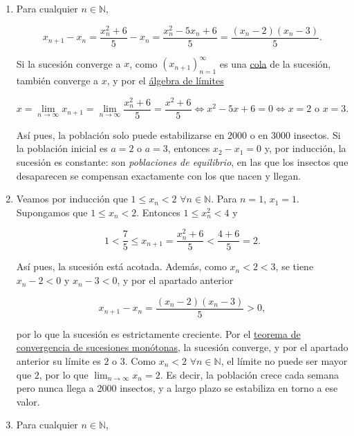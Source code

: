 \documentclass[
  spanish,
  a4paper,
]{scrreport}
\theoremstyle{definition}
\theoremstyle{remark}
\begin{document}
\begin{tcolorbox}[enhanced jigsaw, arc=.35mm, bottomrule=.15mm, bottomtitle=1mm, breakable, colback=white, colbacktitle=quarto-callout-tip-color!10!white, colframe=quarto-callout-tip-color-frame, coltitle=black, left=2mm, leftrule=.75mm, opacityback=0, opacitybacktitle=0.6, rightrule=.15mm, title=\textcolor{quarto-callout-tip-color}{\faLightbulb}\hspace{0.5em}{Solución}, titlerule=0mm, toprule=.15mm, toptitle=1mm]

\begin{enumerate}
\def\labelenumi{\alph{enumi}.}
\item
  Para cualquier \(n\in\mathbb{N}\),

  \[
  x_{n+1}-x_n = \frac{x_n^2+6}{5} - x_n = \frac{x_n^2 - 5x_n + 6}{5} = \frac{(x_n-2)(x_n-3)}{5}.
  \]

  Si la sucesión converge a \(x\), como \((x_{n+1})_{n=1}^\infty\) es
  una
  \href{https://aprendeconalf.es/analisis-manual/04-sucesiones.html\#prp-convergencia-cola-sucesion}{cola}
  de la sucesión, también converge a \(x\), y por el
  \href{https://aprendeconalf.es/analisis-manual/04-sucesiones.html\#prp-algebra-limites-sucesiones}{álgebra
  de límites}

  \[
  x = \lim_{n\to\infty}x_{n+1} = \lim_{n\to\infty}\frac{x_n^2+6}{5} = \frac{x^2+6}{5} \Leftrightarrow x^2-5x+6 = 0 \Leftrightarrow x=2 \text{ o } x=3.
  \]

  Así pues, la población solo puede estabilizarse en 2000 o en 3000
  insectos. Si la población inicial es \(a=2\) o \(a=3\), entonces
  \(x_2-x_1=0\) y, por inducción, la sucesión es constante: son
  \emph{poblaciones de equilibrio}, en las que los insectos que
  desaparecen se compensan exactamente con los que nacen y llegan.
\item
  Veamos por inducción que \(1\leq x_n < 2\) \(\forall n\in\mathbb{N}\).
  Para \(n=1\), \(x_1 = 1\). Supongamos que \(1\leq x_n<2\). Entonces
  \(1\leq x_n^2<4\) y

  \[
  1 < \frac{7}{5} \leq x_{n+1} = \frac{x_n^2+6}{5} < \frac{4+6}{5} = 2.
  \]

  Así pues, la sucesión está acotada. Además, como \(x_n<2<3\), se tiene
  \(x_n-2<0\) y \(x_n-3<0\), y por el apartado anterior

  \[
  x_{n+1}-x_n = \frac{(x_n-2)(x_n-3)}{5} > 0,
  \]

  por lo que la sucesión es estrictamente creciente. Por el
  \href{https://aprendeconalf.es/analisis-manual/04-sucesiones.html\#thm-convergencia-monotona}{teorema
  de convergencia de sucesiones monótonas}, la sucesión converge, y por
  el apartado anterior su límite es \(2\) o \(3\). Como \(x_n<2\)
  \(\forall n\in\mathbb{N}\), el límite no puede ser mayor que \(2\),
  por lo que \(\lim_{n\to\infty}x_n = 2\). Es decir, la población crece
  cada semana pero nunca llega a 2000 insectos, y a largo plazo se
  estabiliza en torno a ese valor.
\item
  Para cualquier \(n\in\mathbb{N}\),


\end{enumerate}
\end{tcolorbox}
\end{document}
